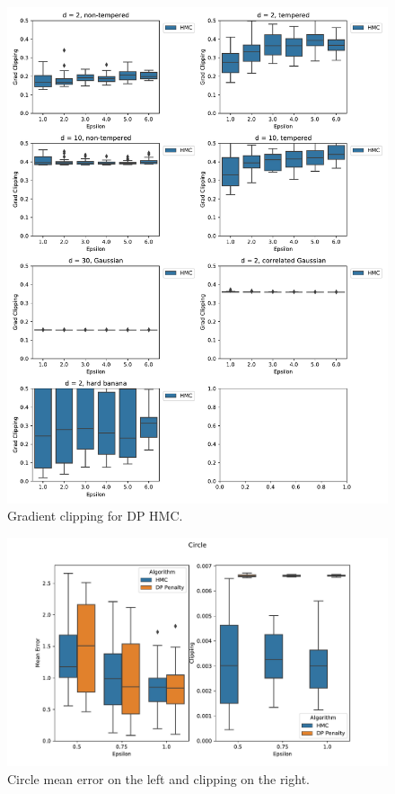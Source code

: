 \documentclass[english,twoside,openright]{HYgraduMLDS}
\begin{document}
\begin{figure}
  \centering
  \includegraphics[width=\textwidth]{figures/banana_grad_clipping}
  \caption{
    Gradient clipping for DP HMC.
  }
  \label{banana_grad_clipping_fig}
\end{figure}

\begin{figure}
  \centering
  \includegraphics[width=\textwidth]{figures/circle}
  \caption{
    Circle mean error on the left and clipping on the right.
  }
  \label{circle_fig}
\end{figure}
\end{document}
